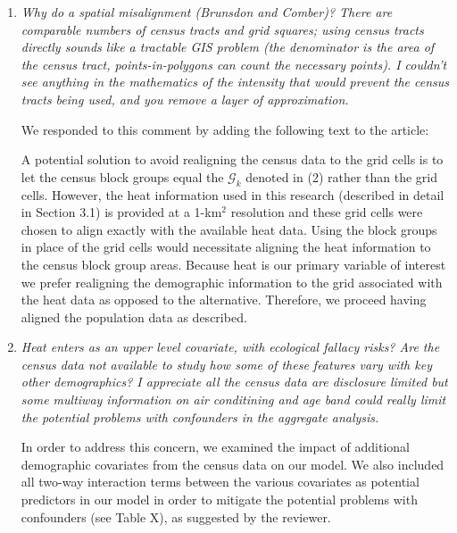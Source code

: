 \documentclass{article}
\begin{document}
\begin{enumerate}

\item\textit{Why do a spatial misalignment (Brunsdon and Comber)?   There are comparable numbers of census tracts and grid squares; using census tracts directly sounds like a tractable GIS problem (the denominator is the area of the census tract, points-in-polygons can count the necessary points).   I couldn't see anything in the mathematics of the intensity that would prevent the census tracts being used, and you remove a layer of approximation.}

We responded to this comment by adding the following text to the article:

\begin{displayquote}
A potential solution to avoid realigning the census data to the grid cells is to let the census block groups equal the $\mathcal{G}_k$ denoted in (2) rather than the grid cells. However, the heat information used in this research (described in detail in Section 3.1) is provided at a 1-km$^2$ resolution and these grid cells were chosen to align exactly with the available heat data. Using the block groups in place of the grid cells would necessitate aligning the heat information to the census block group areas. Because heat is our primary variable of interest we prefer realigning the demographic information to the grid associated with the heat data as opposed to the alternative. Therefore, we proceed having aligned the population data as described.
\end{displayquote}

\item\textit{Heat enters as an upper level covariate, with ecological fallacy risks?   Are the census data not available to study how some of these features vary with key other demographics?   I appreciate all the census data are disclosure limited but some multiway information on air conditining and age band could really limit the potential problems with confounders in the aggregate analysis.}

In order to address this concern, we examined the impact of additional demographic covariates from the census data on our model. We also included all two-way interaction terms between the various covariates as potential predictors in our model in order to mitigate the potential problems with confounders (see Table X), as suggested by the reviewer. 


\end{enumerate}
\end{document}
